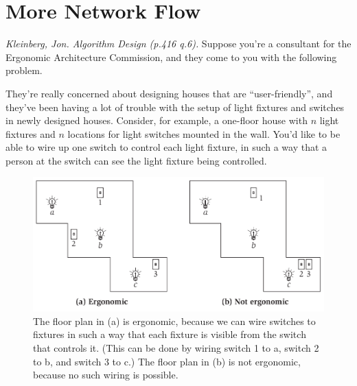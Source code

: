 \documentclass[solutionorbox,answers]{exam}
\begin{document}
\begin{center}
\end{center}
\vspace{0.1in}
 \qquad
{}

\section*{More Network Flow}

\begin{questions}
\question \textit{Kleinberg, Jon. Algorithm Design (p.416 q.6).}
Suppose you’re a consultant for the Ergonomic Architecture Commission,
and they come to you with the following problem.

They're really concerned about designing houses that are ``user-friendly'', and they've been having a lot of trouble with the setup of light
fixtures and switches in newly designed houses. Consider, for example,
a one-floor house with $n$ light fixtures and $n$ locations for light switches
mounted in the wall. You'd like to be able to wire up one switch to control
each light fixture, in such a way that a person at the switch can see the
light fixture being controlled.

\begin{figure}[h]
  \centering
  \includegraphics[width=\textwidth]{fig728.png}
  \caption{The floor plan in (a) is ergonomic, because we can wire switches to fixtures
in such a way that each fixture is visible from the switch that controls it. (This can be
done by wiring switch 1 to a, switch 2 to b, and switch 3 to c.) The floor plan in (b) is not
ergonomic, because no such wiring is possible.}
\end{figure}


\end{questions}
\end{document}
